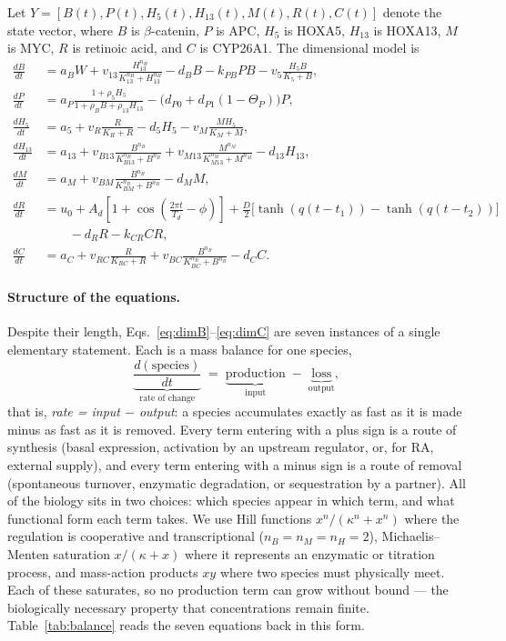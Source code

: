 \documentclass[11pt]{article}
\newcommand{\bcat}{$\beta$-\hspace{0pt}catenin}
\begin{document}
Let $Y = [B(t), P(t), H_5(t), H_{13}(t), M(t), R(t), C(t)]$ denote the state
vector, where $B$ is \bcat{}, $P$ is APC, $H_5$ is HOXA5, $H_{13}$ is HOXA13,
$M$ is MYC, $R$ is retinoic acid, and $C$ is CYP26A1. The dimensional model is
\begin{align}
\frac{dB}{dt}
&= a_BW
+ v_{13}\frac{H_{13}^{n_H}}{K_{13}^{n_H}+H_{13}^{n_H}}
- d_BB - k_{PB}PB - v_5\frac{H_5B}{K_5+B},
\label{eq:dimB}\\[6pt]
\frac{dP}{dt}
&= a_P\frac{1+\rho_5H_5}{1+\rho_BB+\rho_{13}H_{13}}
- \big(d_{P0}+d_{P1}(1-\Theta_P)\big)P,
\label{eq:dimP}\\[6pt]
\frac{dH_5}{dt}
&= a_5 + v_R\frac{R}{K_R+R} - d_5H_5 - v_M\frac{MH_5}{K_M+M},
\label{eq:dimH5}\\[6pt]
\frac{dH_{13}}{dt}
&= a_{13}
+ v_{B13}\frac{B^{n_B}}{K_{B13}^{n_B}+B^{n_B}}
+ v_{M13}\frac{M^{n_M}}{K_{M13}^{n_M}+M^{n_M}}
- d_{13}H_{13},
\label{eq:dimH13}\\[6pt]
\frac{dM}{dt}
&= a_M + v_{BM}\frac{B^{n_B}}{K_{BM}^{n_B}+B^{n_B}} - d_MM,
\label{eq:dimM}\\[6pt]
\frac{dR}{dt}
&= u_0 + A_d\left[1+\cos\left(\frac{2\pi t}{T_d}-\phi\right)\right]
+ \frac{D}{2}\Big[\tanh(q(t-t_1))-\tanh(q(t-t_2))\Big]
\nonumber\\
&\qquad - d_RR - k_{CR}CR,
\label{eq:dimR}\\[6pt]
\frac{dC}{dt}
&= a_C + v_{RC}\frac{R}{K_{RC}+R}
+ v_{BC}\frac{B^{n_B}}{K_{BC}^{n_B}+B^{n_B}} - d_CC.
\label{eq:dimC}
\end{align}

\paragraph{Structure of the equations.}
Despite their length, Eqs.~\eqref{eq:dimB}--\eqref{eq:dimC} are seven instances
of a single elementary statement. Each is a mass balance for one species,
\begin{equation}
\underbrace{\frac{d(\text{species})}{dt}}_{\text{rate of change}}
\;=\;
\underbrace{\text{production}}_{\text{input}}
\;-\;
\underbrace{\text{loss}}_{\text{output}},
\label{eq:balance}
\end{equation}
that is, \emph{rate = input $-$ output}: a species accumulates exactly as fast
as it is made minus as fast as it is removed. Every term entering with a plus
sign is a route of synthesis (basal expression, activation by an upstream
regulator, or, for RA, external supply), and every term entering with a minus
sign is a route of removal (spontaneous turnover, enzymatic degradation, or
sequestration by a partner). All of the biology sits in two choices: which
species appear in which term, and what functional form each term takes. We use
Hill functions $x^{n}/(\kappa^{n}+x^{n})$ where the regulation is cooperative
and transcriptional ($n_B = n_M = n_H = 2$), Michaelis--Menten saturation
$x/(\kappa+x)$ where it represents an enzymatic or titration process, and
mass-action products $xy$ where two species must physically meet. Each of these
saturates, so no production term can grow without bound --- the biologically
necessary property that concentrations remain finite. Table~\ref{tab:balance}
reads the seven equations back in this form.
\end{document}

